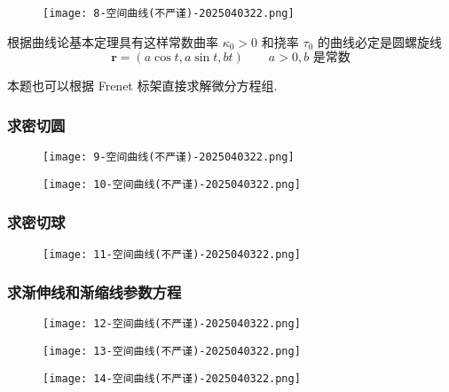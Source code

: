 \begin{figure}[H]
\centering
\texttt{[image: 8-空间曲线(不严谨)-2025040322.png]}
\label{}
\end{figure}

根据曲线论基本定理具有这样常数曲率 $\kappa_0>0$ 和挠率 $\tau_0$ 的曲线必定是圆螺旋线
\[
\boldsymbol{r}=(a\cos t,a\sin t,bt)\qquad a>0,b\text{ 是常数}
\]
\begin{remark}
本题也可以根据 Frenet 标架直接求解微分方程组.
\end{remark}
\subsubsection{求密切圆}

\begin{figure}[H]
\centering
\texttt{[image: 9-空间曲线(不严谨)-2025040322.png]}
\label{}
\end{figure}

\begin{figure}[H]
\centering
\texttt{[image: 10-空间曲线(不严谨)-2025040322.png]}
\label{}
\end{figure}

\subsubsection{求密切球}

\begin{figure}[H]
\centering
\texttt{[image: 11-空间曲线(不严谨)-2025040322.png]}
\label{}
\end{figure}

\subsubsection{求渐伸线和渐缩线参数方程}

\begin{figure}[H]
\centering
\texttt{[image: 12-空间曲线(不严谨)-2025040322.png]}
\label{}
\end{figure} \begin{figure}[H]
\centering
\texttt{[image: 13-空间曲线(不严谨)-2025040322.png]}
\label{}
\end{figure}
\begin{figure}[H]
\centering
\texttt{[image: 14-空间曲线(不严谨)-2025040322.png]}
\label{}
\end{figure}
